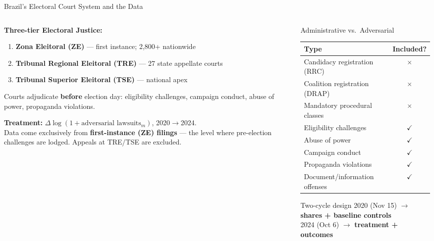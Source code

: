 \documentclass[aspectratio=169,10pt]{beamer}
\newcommand{\tick}{{\color{mygreen}$\checkmark$}}
\newcommand{\cross}{{\color{myred}$\times$}}
\begin{document}
\begin{frame}{Brazil's Electoral Court System and the Data}
\begin{columns}[T]
\begin{column}{0.52\textwidth}
\textbf{Three-tier Electoral Justice:}
\begin{enumerate}
  \item \textbf{Zona Eleitoral (ZE)} --- first instance; 2,800+ nationwide
  \item \textbf{Tribunal Regional Eleitoral (TRE)} --- 27 state appellate courts
  \item \textbf{Tribunal Superior Eleitoral (TSE)} --- national apex
\end{enumerate}
\smallskip
Courts adjudicate \textbf{before} election day: eligibility challenges, campaign conduct, abuse of power, propaganda violations.
\medskip

\textbf{Treatment:} $\Delta\log(1+\text{adversarial lawsuits}_m)$, 2020$\to$2024.\\[3pt]
\footnotesize Data come exclusively from \textbf{first-instance (ZE) filings} --- the level where pre-election challenges are lodged. Appeals at TRE/TSE are excluded.\normalsize
\end{column}
\begin{column}{0.46\textwidth}
\begin{block}{Administrative vs.\ Adversarial}
  \footnotesize
  \renewcommand{\arraystretch}{1.1}
  \begin{tabular}{lc}
    \toprule
    Type & Included? \\
    \midrule
    Candidacy registration (RRC) & \cross \\
    Coalition registration (DRAP) & \cross \\
    Mandatory procedural classes & \cross \\
    \midrule
    Eligibility challenges & \tick \\
    Abuse of power & \tick \\
    Campaign conduct & \tick \\
    Propaganda violations & \tick \\
    Document/information offenses & \tick \\
    \bottomrule
  \end{tabular}
\end{block}
\smallskip
\begin{block}{Two-cycle design}
  \footnotesize
  2020 (Nov 15) $\to$ \textbf{shares + baseline controls}\\
  2024 (Oct 6) $\to$ \textbf{treatment + outcomes}
\end{block}
\end{column}
\end{columns}
\end{frame}
\end{document}
